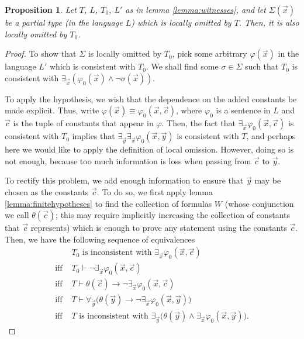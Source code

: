\documentclass{article}
\newtheorem{prop}{Proposition}
\theoremstyle{nonumberplain}
\newtheorem{proof}{Proof}
\begin{document}
\begin{prop}\label{prop:locomit}
Let $T$, $L$, $T_0$, $L'$ as in lemma \ref{lemma:witnesses}, and let $\Sigma(\vec x)$ be a partial type (in the language $L$) which is locally omitted by $T$. Then, it is also locally omitted by $T_0$.
\end{prop}

\begin{proof}
To show that $\Sigma$ is locally omitted by $T_0$, pick some arbitrary $\varphi(\vec x)$ in the language $L'$ which is consistent with $T_0$. We shall find some $\sigma \in \Sigma$ such that $T_0$ is consistent with $\exists_{\vec x}(\varphi_0(\vec x) \land \neg\sigma(\vec x))$.

To apply the hypothesis, we wish that the dependence on the added constants be made explicit. Thus, write $\varphi(\vec x) \equiv \varphi_0(\vec x, \vec c)$, where $\varphi_0$ is a sentence in $L$ and $\vec c$ is the tuple of constants that appear in $\varphi$. Then, the fact that $\exists_{\vec x} \varphi_0(\vec x, \vec c)$ is consistent with $T_0$ implies that $\exists_{\vec y} \exists_{\vec x} \varphi_0(\vec x, \vec y)$ is consistent with $T$, and perhaps here we would like to apply the definition of local omission. However, doing so is not enough, because too much information is loss when passing from $\vec c$ to $\vec y$.

To rectify this problem, we add enough information to ensure that $\vec y$ may be chosen as the constants $\vec c$. To do so, we first apply lemma \ref{lemma:finitehypotheses} to find the collection of formulas $W$ (whose conjunction we call $\theta(\vec c)$; this may require implicitly increasing the collection of constants that $\vec c$ represents) which is enough to prove any statement using the constants $\vec c$. Then, we have the following sequence of equivalences
\begin{equation}\label{eq:inconseqv}
\begin{aligned}
&T_0 \text{ is inconsistent with } \exists_{\vec x} \varphi_0(\vec x, \vec c)\\
\text{iff }& T_0 \vdash \neg \exists_{\vec x} \varphi_0(\vec x, \vec c)\\
\text{iff }& T \vdash \theta(\vec c) \rightarrow \neg \exists_{\vec x} \varphi_0(\vec x, \vec c)\\
\text{iff }& T \vdash \forall_{\vec y} \big( \theta(\vec y) \rightarrow \neg \exists_{\vec x} \varphi_0(\vec x, \vec y) \big)\\
\text{iff }& T \text{ is inconsistent with } \exists_{\vec y} \big( \theta(\vec y) \land \exists_{\vec x} \varphi_0(\vec x, \vec y) \big).
\end{aligned}
\end{equation}


\end{proof}
\end{document}
